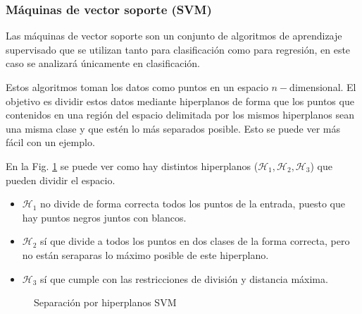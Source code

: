 \subsubsection{Máquinas de vector soporte (SVM)}

Las máquinas de vector soporte son un conjunto de algoritmos de aprendizaje supervisado que se utilizan tanto para clasificación como para regresión, en este caso se analizará únicamente en clasificación.

Estos algoritmos toman los datos como puntos en un espacio $n-$dimensional. El objetivo es dividir estos datos mediante hiperplanos de forma que los puntos que contenidos en una región del espacio delimitada por los mismos hiperplanos sean una misma clase y que estén lo más separados posible. Esto se puede ver más fácil con un ejemplo.

En la Fig. \ref{fig:svm_separation} se puede ver como hay distintos hiperplanos ($\mathcal{H}_1, \mathcal{H}_2, \mathcal{H}_3$) que pueden dividir el espacio. 

\begin{itemize}
    \item $\mathcal{H}_1$ no divide de forma correcta todos los puntos de la entrada, puesto que hay puntos negros juntos con blancos.
    \item $\mathcal{H}_2$ sí que divide a todos los puntos en dos clases de la forma correcta, pero no están seraparas lo máximo posible de este hiperplano.
    \item $\mathcal{H}_3$ sí que cumple con las restricciones de división y distancia máxima.
\end{itemize}

\begin{figure}
    \centering
    \caption{Separación por hiperplanos SVM \cite{svmseparation2012}}
    \label{fig:svm_separation}
\end{figure}

